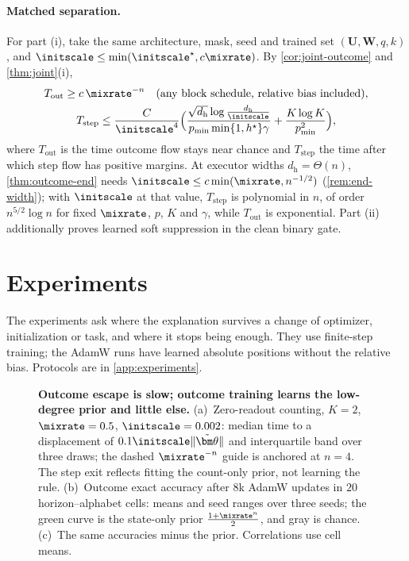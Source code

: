 \paragraph{Matched separation.} For part (i), take the same architecture, mask, seed and trained set $(\mathbf U,\mathbf W,q,k)$, and $\initscale\le\min(\initscale^\star,c\mixrate)$.
By \cref{cor:joint-outcome} and \cref{thm:joint}(i),
\begin{gather*}
 T_{\mathrm{out}}\ge c\,\mixrate^{-n}\quad\text{(any block schedule, relative bias included)},\\
 T_{\mathrm{step}}\le\frac{C}{\initscale^4}\Bigl(\frac{\sqrt{d_{\mathrm h}}\log\frac{d_{\mathrm h}}{\initscale}}{p_{\min}\min\{1,h^\star\}\gamma}+\frac{K\log K}{p_{\min}^2}\Bigr),
\end{gather*}
where $T_{\mathrm{out}}$ is the time outcome flow stays near chance and $T_{\mathrm{step}}$ the time after which step flow has positive margins. At executor
widths $d_{\mathrm h}=\Theta(n)$, \cref{thm:outcome-end} needs $\initscale\le c\min(\mixrate,n^{-1/2})$ (\cref{rem:end-width}); with $\initscale$ at that value, $T_{\mathrm{step}}$ is polynomial
in $n$, of order $n^{5/2}\log n$ for fixed $\mixrate$, $p$, $K$ and $\gamma$, while $T_{\mathrm{out}}$ is exponential. Part (ii) additionally proves learned soft suppression in the clean binary gate.

\suppressfloats[t]
\section{Experiments}
\label{sec:experiments}
\label{sec:validation}

The experiments ask where the explanation survives a change of optimizer, initialization or task, and where it stops being enough.
They use finite-step training; the AdamW runs have learned absolute positions without the relative bias. Protocols are in \cref{app:experiments}.

\begin{figure}[t]
\centering
\resizebox{\linewidth}{!}{}
\caption{\textbf{Outcome escape is slow; outcome training learns the low-degree prior and little else.}
(a)~Zero-readout counting, $K=2$, $\mixrate=0.5$, $\initscale=0.002$: median time to a displacement of $0.1\initscale\|\tilde{\bm\theta}\|$ and interquartile band over three draws; the dashed $\mixrate^{-n}$ guide is anchored at $n=4$. The step exit reflects fitting the count-only prior, not learning the rule.
(b)~Outcome exact accuracy after $8$k AdamW updates in $20$ horizon--alphabet cells: means and seed ranges over three seeds; the green curve is the state-only prior $\frac{1+\mixrate^n}{2}$, and gray is chance.
(c)~The same accuracies minus the prior. Correlations use cell means.}
\label{fig:theory-measurement}
\label{fig:lambda-grid}
\end{figure}

